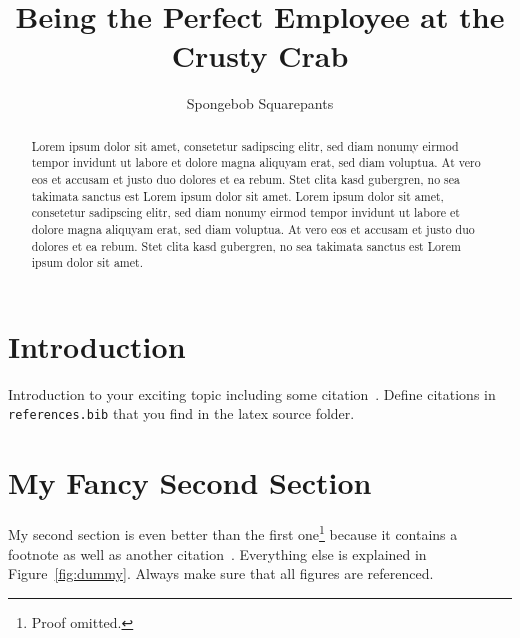 \documentclass{ACGSeminar}
\begin{document}
\title{Being the Perfect Employee at the Crusty Crab }

\author{Spongebob Squarepants}

\maketitle


\begin{abstract}%
Lorem ipsum dolor sit amet, consetetur sadipscing elitr, sed diam nonumy eirmod
tempor invidunt ut labore et dolore magna aliquyam erat, sed diam voluptua. At
vero eos et accusam et justo duo dolores et ea rebum. Stet clita kasd
gubergren, no sea takimata sanctus est Lorem ipsum dolor sit amet. Lorem ipsum
dolor sit amet, consetetur sadipscing elitr, sed diam nonumy eirmod tempor
invidunt ut labore et dolore magna aliquyam erat, sed diam voluptua. At vero
eos et accusam et justo duo dolores et ea rebum. Stet clita kasd gubergren, no
sea takimata sanctus est Lorem ipsum dolor sit amet.
\end{abstract}

\tableofcontents


\section{Introduction}

Introduction to your exciting topic including
some citation~\cite{Plankton2003}. Define citations
in \verb+references.bib+ that you find in
the latex source folder.


\section{My Fancy Second Section}

My second section is even better than the
first one\footnote{Proof omitted.}
because it contains a footnote as well as another
citation~\cite{Plankton2011}. Everything else is
explained in Figure~\ref{fig:dummy}. Always make sure
that all figures are referenced.
\end{document}

